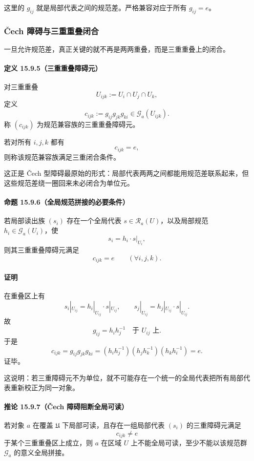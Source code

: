 这里的 \(g_{ij}\) 就是局部代表之间的规范差。严格兼容对应于所有 \(g_{ij}=e\)。

\subsubsection{Čech 障碍与三重重叠闭合}

一旦允许规范差，真正关键的就不再是两两重叠，而是三重重叠上的闭合。

\paragraph{定义 15.9.5（三重重叠障碍元）}
对三重重叠
\[
U_{ijk}:=U_i\cap U_j\cap U_k,
\]
定义
\[
c_{ijk}:=g_{ij}g_{jk}g_{ki}\in \mathscr G_a(U_{ijk}).
\]
称 \((c_{ijk})\) 为规范兼容族的三重重叠障碍元。

若对所有 \(i,j,k\) 都有
\[
c_{ijk}=e,
\]
则称该规范兼容族满足三重闭合条件。

这正是 Čech 型障碍最原始的形式：局部代表两两之间都能用规范差联系起来，但这些规范差绕一圈回来未必闭合为单位元。

\paragraph{命题 15.9.6（全局规范拼接的必要条件）}
若局部读出族 \((s_i)\) 存在一个全局代表 \(s\in \mathscr R_a(U)\)，以及局部规范 \(h_i\in \mathscr G_a(U_i)\)，使
\[
s_i=h_i\cdot s|_{U_i},
\]
则其三重重叠障碍元满足
\[
c_{ijk}=e\qquad(\forall i,j,k).
\]

\paragraph{证明}
在重叠区上有
\[
s_i|_{U_{ij}} = h_i|_{U_{ij}}\cdot s|_{U_{ij}},
\qquad
s_j|_{U_{ij}} = h_j|_{U_{ij}}\cdot s|_{U_{ij}}.
\]
故
\[
g_{ij}=h_i h_j^{-1}
\quad\text{于 }U_{ij}\text{ 上}.
\]
于是
\[
c_{ijk}
=
g_{ij}g_{jk}g_{ki}
=(h_i h_j^{-1})(h_j h_k^{-1})(h_k h_i^{-1})
=e.
\]
证毕。

这说明：若三重障碍元不为单位，就不可能存在一个统一的全局代表把所有局部代表重新校正为同一对象。

\paragraph{推论 15.9.7（Čech 障碍阻断全局可读）}
若对象 \(a\) 在覆盖 \(\mathfrak U\) 下局部可读，且存在一组局部代表 \((s_i)\) 的三重障碍元满足
\[
c_{ijk}\neq e
\]
于某个三重重叠区上成立，则 \(a\) 在区域 \(U\) 上不能全局可读，至少不能以该规范群 \(\mathscr G_a\) 的意义全局拼接。

